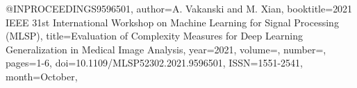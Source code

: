 @INPROCEEDINGS{9596501,
  author={A. {Vakanski} and M. {Xian}},
  booktitle={2021 IEEE 31st International Workshop on Machine Learning for Signal Processing (MLSP)}, 
  title={Evaluation of Complexity Measures for Deep Learning Generalization in Medical Image Analysis}, 
  year={2021},
  volume={},
  number={},
  pages={1-6},
  doi={10.1109/MLSP52302.2021.9596501},
  ISSN={1551-2541},
  month={October},}
